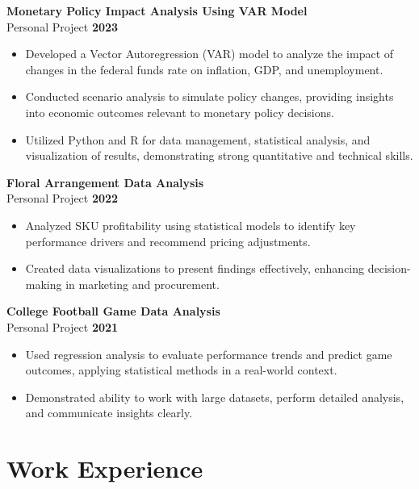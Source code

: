 \documentclass[10pt]{article}
\begin{document}
\textbf{Monetary Policy Impact Analysis Using VAR Model} \\
Personal Project \hfill \textbf{2023} \\
\begin{itemize}[noitemsep,nosep]
    \item Developed a Vector Autoregression (VAR) model to analyze the impact of changes in the federal funds rate on inflation, GDP, and unemployment.
    \item Conducted scenario analysis to simulate policy changes, providing insights into economic outcomes relevant to monetary policy decisions.
    \item Utilized Python and R for data management, statistical analysis, and visualization of results, demonstrating strong quantitative and technical skills.
\end{itemize}

\vspace{5pt}
\noindent\textbf{Floral Arrangement Data Analysis} \\
Personal Project \hfill \textbf{2022} \\
\begin{itemize}[noitemsep,nosep]
    \item Analyzed SKU profitability using statistical models to identify key performance drivers and recommend pricing adjustments.
    \item Created data visualizations to present findings effectively, enhancing decision-making in marketing and procurement.
\end{itemize}

\vspace{5pt}
\noindent\textbf{College Football Game Data Analysis} \\
Personal Project \hfill \textbf{2021} \\
\begin{itemize}[noitemsep,nosep]
    \item Used regression analysis to evaluate performance trends and predict game outcomes, applying statistical methods in a real-world context.
    \item Demonstrated ability to work with large datasets, perform detailed analysis, and communicate insights clearly.
\end{itemize}

\vspace{-10pt}
\section*{Work Experience}
\vspace{0pt}
\end{document}
